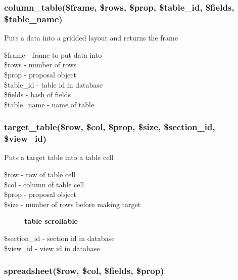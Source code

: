 \documentclass{article}
\begin{document}
\subsubsection*{column\_table(\$frame, \$rows, \$prop, \$table\_id, \$fields, \$table\_name)\label{BuildTable_column_table_frame_rows_prop_table_id_fields_table_name_}}


Puts a data into a gridded layout and returns the frame

\begin{description}

\item[{\$frame - frame to put data into}] \mbox{}
\item[{\$rows - number of rows}] \mbox{}
\item[{\$prop - proposal object}] \mbox{}
\item[{\$table\_id - table id in database}] \mbox{}
\item[{\$fields - hash of fields}] \mbox{}
\item[{\$table\_name - name of table}] \mbox{}\end{description}
\subsubsection*{target\_table(\$row, \$col, \$prop, \$size, \$section\_id, \$view\_id)\label{BuildTable_target_table_row_col_prop_size_section_id_view_id_}}


Puts a target table into a table cell

\begin{description}

\item[{\$row - row of table cell}] \mbox{}
\item[{\$col - column of table cell}] \mbox{}
\item[{\$prop - proposal object}] \mbox{}
\item[{\$size - number of rows before making target}] \textbf{table scrollable}
\item[{\$section\_id - section id in database}] \mbox{}
\item[{\$view\_id - view id in database}] \mbox{}\end{description}
\subsubsection*{spreadsheet(\$row, \$col, \$fields, \$prop)\label{BuildTable_spreadsheet_row_col_fields_prop_}}
\end{document}
